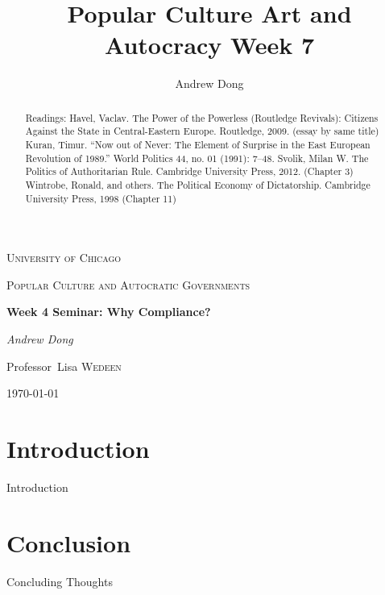\documentclass{article}
\begin{document}
\begin{titlepage}
	\centering
	{\scshape\LARGE University of Chicago \par}
	\vspace{1cm}
	{\scshape\Large Popular Culture and Autocratic Governments\par}
	\vspace{1.5cm}
	{\huge\bfseries Week 4 Seminar: Why Compliance?\par}
	\vspace{1cm}
	{\Large\itshape Andrew Dong\par}
	\vspace{2cm}
	
	\vfill


\begin{abstract}
Readings: 
Havel, Vaclav. The Power of the Powerless (Routledge Revivals): Citizens Against the State in Central-Eastern Europe. Routledge, 2009. (essay by same title)
Kuran, Timur. “Now out of Never: The Element of Surprise in the East European Revolution of 1989.” World Politics 44, no. 01 (1991): 7–48.
 	Svolik, Milan W. The Politics of Authoritarian Rule. Cambridge University Press, 2012. (Chapter 3) 
Wintrobe, Ronald, and others. The Political Economy of Dictatorship. Cambridge University Press, 1998 (Chapter 11)
\end{abstract}

\vfill

	Professor~Lisa \textsc{Wedeen}
	\vspace{5 mm}
	\\{\large \today\par}
\end{titlepage}

\title{Popular Culture Art and Autocracy Week 7}
\author{Andrew Dong}

\maketitle


\section{Introduction}

Introduction




\section{Conclusion}

Concluding Thoughts
\end{document}
